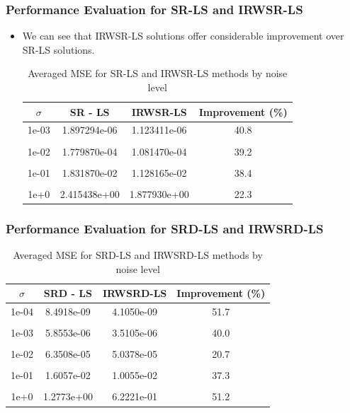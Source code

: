 \documentclass [t] {beamer} %
\begin{document}
\begin{frame} %

\frametitle{Performance Evaluation for SR-LS and IRWSR-LS} 
\normalsize
\begin{itemize}
\item 
We can see that IRWSR-LS solutions offer considerable improvement over SR-LS solutions.
\begin{table}
\caption[c]{Averaged MSE for SR-LS and IRWSR-LS methods by noise level}
\begin{tabular}{|c|c|c|c|}
\toprule
\textbf{$\sigma$ } & \textbf{SR - LS} & \textbf{IRWSR-LS } & \textbf{Improvement (\%)}\\
\midrule 
1e-03&	1.897294e-06&	1.123411e-06& 40.8	\\ &&&\\
1e-02&	1.779870e-04&	1.081470e-04& 39.2	\\ &&&\\
1e-01&	1.831870e-02&	1.128165e-02& 38.4	\\ &&&\\
1e+0&	2.415438e+00&	1.877930e+00& 22.3	\\ %
\bottomrule
\end{tabular}
\end{table}

\end{itemize}
\end{frame}


\begin{frame} %
\frametitle{Performance Evaluation for SRD-LS and IRWSRD-LS} 
\normalsize

\begin{table}
\caption{Averaged MSE for SRD-LS and IRWSRD-LS methods by noise level}
\begin{tabular}{|c|c|c|c|}
\toprule
\textbf{$\sigma$ } & \textbf{SRD - LS} & \textbf{IRWSRD-LS } & \textbf{Improvement (\%)}\\
\midrule
1e-04&	8.4918e-09&	4.1050e-09& 51.7\\ &&&\\
1e-03&	5.8553e-06&	3.5105e-06& 40.0\\ &&&\\
1e-02&	6.3508e-05&	5.0378e-05& 20.7\\ &&&\\
1e-01&	1.6057e-02&	1.0055e-02& 37.3\\ &&&\\
1e+0&	1.2773e+00&	6.2221e-01& 51.2\\ %
\bottomrule
\end{tabular}
\end{table}
\end{frame}
\end{document}
